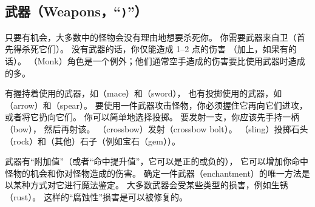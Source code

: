 \documentclass[a4paper, 10pt]{article}
\begin{document}
\subsection*{武器（Weapons，“{\tt )}”）}

只要有机会，大多数\zhTransMazesOfMenace{}中的怪物会没有理由地想要杀死你。
你需要武器来自卫（首先得杀死它们）。
没有武器的话，你仅能造成 1--2 点\zhTransHitPoints{}的伤害
（加上\zhTransBonuses，如果有的话）。
\zhTransMonks{}（Monk）角色是一个例外；他们通常空手造成的伤害要比使用武器时造成的多。

有握持着使用的武器，如\zhTransMaces{}（mace）和\zhTransSwords（sword），
也有投掷使用的武器，如\zhTransArrows（arrow）和\zhTransSpears（spear）。
要使用一件武器攻击怪物，你必须握住它再向它们进攻，或者将它扔向它们。
你可以简单地选择投掷\zhTransSpears。
要发射一支\zhTransArrows，你应该先手持一柄\zhTransBow（bow），
然后再射该\zhTransArrows。
\zhTransCrossbow（crossbow）发射\zhTransCrossbowBolt（crossbow bolt）。
\zhTransSling（sling）投掷石头（rock）和（其他）石子（例如宝石（gem））。

\zhTransEnchanted{}武器有“附加值”（或者“命中提升值”，它可以是正的或负的），
它可以增加你命中怪物的机会和你对怪物造成的伤害。
确定一件武器\zhTransEnchantments{}（enchantment）的唯一方法是以某种方式对它进行魔法鉴定。
大多数武器会受某些类型的损害，例如生锈（rust）。
这样的“腐蚀性”损害是可以被修复的。
\end{document}
